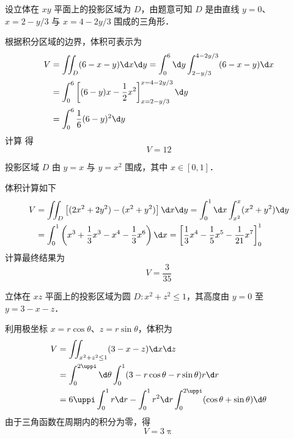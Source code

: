 \begin{solution}
     设立体在 $xy$ 平面上的投影区域为 $D$，由题意可知 $D$ 是由直线 $y=0$、$x = 2 - y/3$ 与 $x = 4 - 2y/3$ 围成的三角形．

    根据积分区域的边界，体积可表示为
    \begin{equation}
        \begin{aligned}
            V & = \iint_D (6 - x - y) \d x \d y = \int_0^6 \d y \int_{2 - y/3}^{4 - 2y/3} (6 - x - y) \d x \\
              & = \int_0^6 \left[ (6 - y)x - \frac{1}{2}x^2 \right]_{x=2-y/3}^{x=4-2y/3} \d y              \\
              & = \int_0^6 \frac{1}{6}(6 - y)^2 \d y \label{eq:v1-step}
        \end{aligned}
    \end{equation}
    计算  得
    \begin{equation}
        V = \boxed{12}
    \end{equation}

     投影区域 $D$ 由 $y = x$ 与 $y = x^2$ 围成，其中 $x \in [0, 1]$．

    体积计算如下
    \begin{equation}
        \begin{aligned}
            V & = \iint_D \left[ (2x^2 + 2y^2) - (x^2 + y^2) \right] \d x \d y = \int_0^1 \d x \int_{x^2}^x (x^2 + y^2) \d y                                      \\
              & = \int_0^1 \left( x^3 + \frac{1}{3}x^3 - x^4 - \frac{1}{3}x^6 \right) \d x = \left[ \frac{1}{3}x^4 - \frac{1}{5}x^5 - \frac{1}{21}x^7 \right]_0^1
        \end{aligned}
    \end{equation}
    计算最终结果为
    \begin{equation}
        V = \boxed{\frac{3}{35}}
    \end{equation}

     立体在 $xz$ 平面上的投影区域为圆 $D \colon x^2 + z^2 \le 1$，其高度由 $y=0$ 至 $y = 3 - x - z$．

    利用极坐标 $x = r \cos \theta$、$z = r \sin \theta$，体积为
    \begin{equation}
        \begin{aligned}
            V & = \iint_{x^2+z^2 \le 1} (3 - x - z) \d x \d z                                                      \\
              & = \int_0^{2\uppi} \d \theta \int_0^1 (3 - r \cos \theta - r \sin \theta) r \d r                    \\
              & = 6\uppi \int_0^1 r \d r - \int_0^1 r^2 \d r \int_0^{2\uppi} (\cos \theta + \sin \theta) \d \theta
        \end{aligned}
    \end{equation}
    由于三角函数在周期内的积分为零，得
    \begin{equation}
        V = \boxed{3\uppi}
    \end{equation}


\end{solution}
